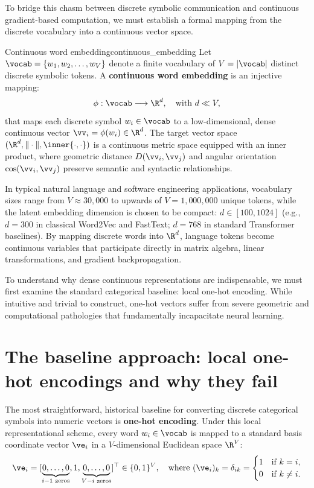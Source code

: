 \documentclass[../../main.tex]{subfiles}
\begin{document}
To bridge this chasm between discrete symbolic communication and continuous gradient-based computation, we must establish a formal mapping from the discrete vocabulary into a continuous vector space.

\begin{definition}{Continuous word embedding}{continuous_embedding}
Let $\vocab = \{w_1, w_2, \dots, w_V\}$ denote a finite vocabulary of $V = |\vocab|$ distinct discrete symbolic tokens. A \textbf{continuous word embedding} is an injective mapping:
\begin{equation}
\label{eq:embedding_mapping_def}
\phi: \vocab \longrightarrow \R^d, \quad \text{with } d \ll V,
\end{equation}
that maps each discrete symbol $w_i \in \vocab$ to a low-dimensional, dense continuous vector $\vv_i = \phi(w_i) \in \R^d$. The target vector space $(\R^d, \|\cdot\|, \inner{\cdot, \cdot})$ is a continuous metric space equipped with an inner product, where geometric distance $D(\vv_i, \vv_j)$ and angular orientation $\cos(\vv_i, \vv_j)$ preserve semantic and syntactic relationships.
\end{definition}

In typical natural language and software engineering applications, vocabulary sizes range from $V \approx 30{,}000$ to upwards of $V = 1{,}000{,}000$ unique tokens, while the latent embedding dimension is chosen to be compact: $d \in [100, 1024]$ (e.g., $d = 300$ in classical Word2Vec and FastText; $d = 768$ in standard Transformer baselines). By mapping discrete words into $\R^d$, language tokens become continuous variables that participate directly in matrix algebra, linear transformations, and gradient backpropagation.

To understand why dense continuous representations are indispensable, we must first examine the standard categorical baseline: local one-hot encoding. While intuitive and trivial to construct, one-hot vectors suffer from severe geometric and computational pathologies that fundamentally incapacitate neural learning.

\section{The baseline approach: local one-hot encodings and why they fail}
\label{sec:onehot_baseline}

The most straightforward, historical baseline for converting discrete categorical symbols into numeric vectors is \textbf{one-hot encoding}. Under this local representational scheme, every word $w_i \in \vocab$ is mapped to a standard basis coordinate vector $\ve_i$ in a $V$-dimensional Euclidean space $\R^V$:
\begin{equation}
\label{eq:onehot_def}
\ve_i = [\underbrace{0, \dots, 0}_{i-1\text{ zeros}}, 1, \underbrace{0, \dots, 0}_{V-i\text{ zeros}}]^\top \in \{0, 1\}^V, \quad \text{where } (\ve_i)_k = \delta_{ik} = \begin{cases} 1 & \text{if } k = i, \\ 0 & \text{if } k \neq i. \end{cases}
\end{equation}
\end{document}
